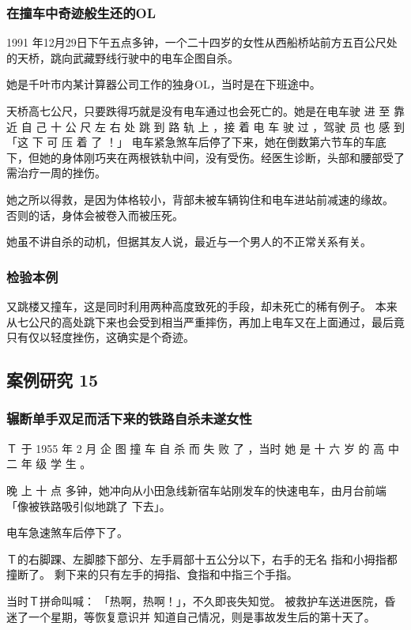 \documentclass[UTF8]{ctexart}
\begin{document}
\subsubsection*{在撞车中奇迹般生还的OL}

1991 年12月29日下午五点多钟，一个二十四岁的女性从西船桥站前方五百公尺处
的天桥，跳向武藏野线行驶中的电车企图自杀。

她是千叶市内某计算器公司工作的独身OL，当时是在下班途中。

天桥高七公尺，只要跌得巧就是没有电车通过也会死亡的。她是在电车驶 进 至 靠 近 自 己 十 公 尺 左 右 处 跳 到 路 轨 上 ，接 着 电 车 驶 过 ，驾驶 员 也 感 到「这 下 可 压 着 了 ！」 电车紧急煞车后停了下来，她在倒数第六节车的车底下，但她的身体刚巧夹在两根铁轨中间，没有受伤。经医生诊断，头部和腰部受了需治疗一周的挫伤。

她之所以得救，是因为体格较小，背部未被车辆钩住和电车进站前减速的缘故。
否则的话，身体会被卷入而被压死。

她虽不讲自杀的动机，但据其友人说，最近与一个男人的不正常关系有关。

\subsubsection*{检验本例}

又跳楼又撞车，这是同时利用两种高度致死的手段，却未死亡的稀有例子。
本来从七公尺的高处跳下来也会受到相当严重摔伤，再加上电车又在上面通过，最后竟只有仅以轻度挫伤，这确实是个奇迹。


\subsection{案例研究 15}

\subsubsection*{辗断单手双足而活下来的铁路自杀未遂女性}

Ｔ 于 1955 年 2 月 企 图 撞 车 自 杀 而 失 败 了 ，当时 她 是 十 六 岁 的 高 中 二 年 级 学 生 。

晚 上 十 点 多钟，她冲向从小田急线新宿车站刚发车的快速电车，由月台前端「像被铁路吸引似地跳了 下去」。

电车急速煞车后停下了。

Ｔ的右脚踝、左脚膝下部分、左手肩部十五公分以下，右手的无名 指和小拇指都撞断了。
剩下来的只有左手的拇指、食指和中指三个手指。

当时Ｔ拼命叫喊： 「热啊，热啊！」，不久即丧失知觉。
被救护车送进医院，昏迷了一个星期，等恢复意识并 知道自己情况，则是事故发生后的第十天了。
\end{document}
